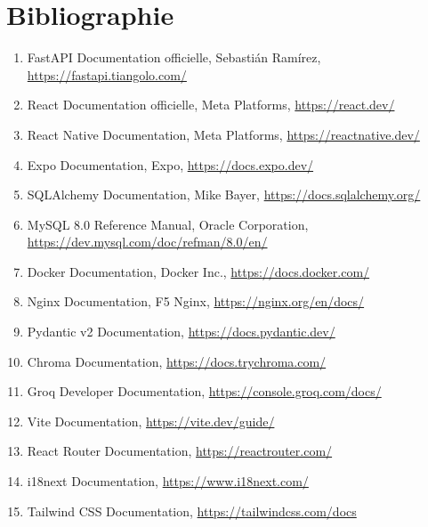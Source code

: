 \chapter*{Bibliographie}
\adjustmtc
\thispagestyle{MyStyle}

\begin{enumerate}
    \item FastAPI Documentation officielle, Sebastián Ramírez, \url{https://fastapi.tiangolo.com/}

    \item React Documentation officielle, Meta Platforms, \url{https://react.dev/}

    \item React Native Documentation, Meta Platforms, \url{https://reactnative.dev/}

    \item Expo Documentation, Expo, \url{https://docs.expo.dev/}

    \item SQLAlchemy Documentation, Mike Bayer, \url{https://docs.sqlalchemy.org/}

    \item MySQL 8.0 Reference Manual, Oracle Corporation, \url{https://dev.mysql.com/doc/refman/8.0/en/}

    \item Docker Documentation, Docker Inc., \url{https://docs.docker.com/}

    \item Nginx Documentation, F5 Nginx, \url{https://nginx.org/en/docs/}

    \item Pydantic v2 Documentation, \url{https://docs.pydantic.dev/}

    \item Chroma Documentation, \url{https://docs.trychroma.com/}

    \item Groq Developer Documentation, \url{https://console.groq.com/docs/}

    \item Vite Documentation, \url{https://vite.dev/guide/}

    \item React Router Documentation, \url{https://reactrouter.com/}

    \item i18next Documentation, \url{https://www.i18next.com/}

    \item Tailwind CSS Documentation, \url{https://tailwindcss.com/docs}


\end{enumerate}
